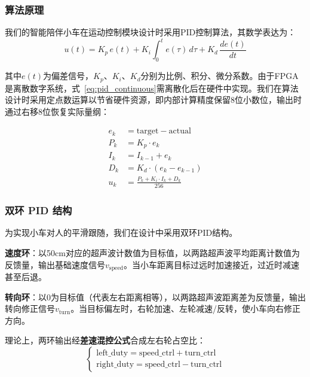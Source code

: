 \documentclass[12pt,a4paper]{ctexart}
\begin{document}
\subsubsection{算法原理}

我们的智能陪伴小车在运动控制模块设计时采用PID控制算法，其数学表达为：
\begin{equation}
u(t) = K_p \, e(t) + K_i \int_0^t e(\tau) \, d\tau + K_d \, \frac{de(t)}{dt}
\label{eq:pid_continuous}
\end{equation}

其中$e(t)$为偏差信号，$K_p$、$K_i$、$K_d$分别为比例、积分、微分系数。由于FPGA是离散数字系统，式~\ref{eq:pid_continuous}需离散化后在硬件中实现。我们在算法设计时采用定点数运算以节省硬件资源，即内部计算精度保留8位小数位，输出时通过右移8位恢复实际量纲：

\begin{align}
e_k &= \text{target} - \text{actual} \nonumber\\
P_k &= K_p \cdot e_k \nonumber\\
I_k &= I_{k-1} + e_k \nonumber\\
D_k &= K_d \cdot (e_k - e_{k-1}) \nonumber\\
u_k &= \frac{P_k + K_i \cdot I_k + D_k}{256} \label{eq:pid_discrete}
\end{align}

\subsubsection{双环 PID 结构}

为实现小车对人的平滑跟随，我们在设计中采用双环PID结构。

\textbf{速度环}：以50cm对应的超声波计数值为目标值，以两路超声波平均距离计数值为反馈量，输出基础速度信号$v_{\text{speed}}$。当小车距离目标过远时加速接近，过近时减速甚至后退。

\textbf{转向环}：以0为目标值（代表左右距离相等），以两路超声波距离差为反馈量，输出转向修正信号$v_{\text{turn}}$。当目标偏左时，右轮加速、左轮减速/反转，使小车向右修正方向。

理论上，两环输出经\textbf{差速混控公式}合成左右轮占空比：
\begin{equation}
\begin{cases}
\text{left\_duty} = \text{speed\_ctrl} + \text{turn\_ctrl} \\[4pt]
\text{right\_duty} = \text{speed\_ctrl} - \text{turn\_ctrl}
\end{cases}
\label{eq:mixing}
\end{equation}
\end{document}
